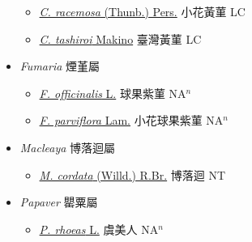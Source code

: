 \begin{itemize}
\begin{itemize}
        \item[] \href{http://www.theplantlist.org/tpl1.1/search?q=Corydalis+racemosa}{\textit{C. racemosa} (Thunb.) Pers.}   小花黃菫 LC
        \item[] \href{http://www.theplantlist.org/tpl1.1/search?q=Corydalis+tashiroi}{\textit{C. tashiroi} Makino}   臺灣黃菫 LC
  \end{itemize}
 \item[] \textit{Fumaria} 煙堇屬
                    
  \begin{itemize}
        \item[] \href{http://www.theplantlist.org/tpl1.1/search?q=Fumaria+officinalis}{\textit{F. officinalis} L.}   球果紫菫 NA$^n$
        \item[] \href{http://www.theplantlist.org/tpl1.1/search?q=Fumaria+parviflora}{\textit{F. parviflora} Lam.}   小花球果紫菫 NA$^n$
  \end{itemize}
 \item[] \textit{Macleaya} 博落迴屬
                    
  \begin{itemize}
        \item[] \href{http://www.theplantlist.org/tpl1.1/search?q=Macleaya+cordata}{\textit{M. cordata} (Willd.) R.Br.}   博落迴 NT
  \end{itemize}
 \item[] \textit{Papaver} 罌粟屬
                    
  \begin{itemize}
        \item[] \href{http://www.theplantlist.org/tpl1.1/search?q=Papaver+rhoeas}{\textit{P. rhoeas} L.}   虞美人 NA$^n$
  \end{itemize}
  \end{itemize}
